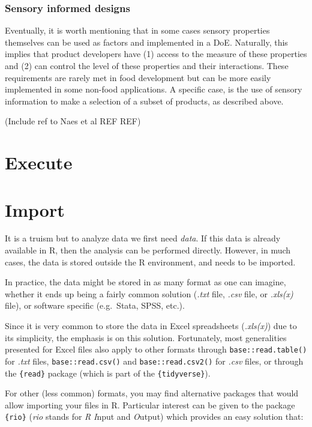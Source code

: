 \documentclass[
]{book}
\begin{document}
\hypertarget{sensory-informed-designs}{%
\subsubsection{Sensory informed designs}\label{sensory-informed-designs}}

Eventually, it is worth mentioning that in some cases sensory properties themselves can be used as factors and implemented in a DoE. Naturally, this implies that product developers have (1) access to the measure of these properties and (2) can control the level of these properties and their interactions. These requirements are rarely met in food development but can be more easily implemented in some non-food applications.
A specific case, is the use of sensory information to make a selection of a subset of products, as described above.

(Include ref to Naes et al REF REF)

\hypertarget{execute-1}{%
\section{Execute}\label{execute-1}}

\hypertarget{data-import}{%
\section{Import}\label{data-import}}

It is a truism but to analyze data we first need \emph{data}. If this data is already available in R, then the analysis can be performed directly. However, in much cases, the data is stored outside the R environment, and needs to be imported.

In practice, the data might be stored in as many format as one can imagine, whether it ends up being a fairly common solution (\emph{.txt} file, \emph{.csv} file, or \emph{.xls(x)} file), or software specific (e.g.~Stata, SPSS, etc.).

Since it is very common to store the data in Excel spreadsheets (\emph{.xls(x)}) due to its simplicity, the emphasis is on this solution. Fortunately, most generalities presented for Excel files also apply to other formats through \texttt{base::read.table()} for \emph{.txt} files, \texttt{base::read.csv()} and \texttt{base::read.csv2()} for \emph{.csv} files, or through the \texttt{\{read\}} package (which is part of the \texttt{\{tidyverse\}}).

For other (less common) formats, you may find alternative packages that would allow importing your files in R. Particular interest can be given to the package \texttt{\{rio\}} (\emph{rio} stands for \emph{R} \emph{I}nput and \emph{O}utput) which provides an easy solution that:
\end{document}
